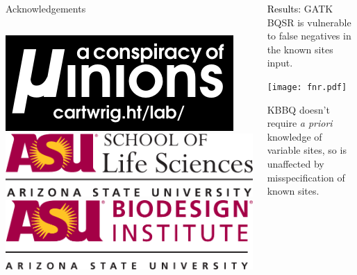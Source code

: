 \documentclass{beamer}
\begin{document}
\begin{frame}{}
\begin{columns}[T]
\begin{column}[T]{.5\linewidth}
\begin{block}{Acknowledgements}
\begin{columns}
\includegraphics[width=\linewidth]{lab_logo.pdf}
\includegraphics[width=\linewidth]{sols_logo.pdf}
\includegraphics[width=\linewidth]{biodesign_logo.pdf}
\end{columns}


\end{block}

\end{column}
\begin{column}[T]{.5\linewidth}


\begin{block}{\textcolor{black}{Results:} GATK BQSR is vulnerable to false negatives in the known sites input.}
\begin{center}
\texttt{[image: fnr.pdf]}
\end{center}
KBBQ doesn't require \textit{a priori} knowledge of variable sites, so is unaffected by misspecification of known sites.
\end{block}


\end{column}
\end{columns}
\end{frame}
\end{document}
